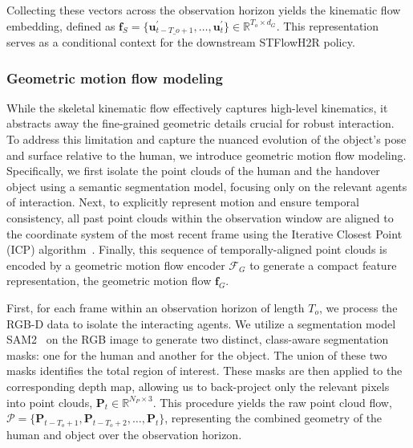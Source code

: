 \documentclass[final,5p,times,twocolumn]{elsarticle}
\begin{document}
Collecting these vectors across the observation horizon yields the kinematic flow embedding, defined as $\bm{f}_S = \{ \mathbf{u}_{t-T\_o + 1}^\prime, \dots, \mathbf{u}_{t}^\prime \} \in \mathbb{R}^{T_o \times d_G}$. This representation serves as a conditional context for the downstream STFlowH2R policy.



\subsubsection{Geometric motion flow modeling}  \label{sec:3.3.2}
While the skeletal kinematic flow effectively captures high-level kinematics, it abstracts away the fine-grained geometric details crucial for robust interaction. To address this limitation and capture the nuanced evolution of the object's pose and surface relative to the human, we introduce geometric motion flow modeling. Specifically, we first isolate the point clouds of the human and the handover object using a semantic segmentation model, focusing only on the relevant agents of interaction. Next, to explicitly represent motion and ensure temporal consistency, all past point clouds within the observation window are aligned to the coordinate system of the most recent frame using the Iterative Closest Point (ICP) algorithm~\cite{4767965}. Finally, this sequence of temporally-aligned point clouds is encoded by a geometric motion flow encoder $\mathcal{F}_G$ to generate a compact feature representation, the geometric motion flow $\bm{f}_G$.

First, for each frame within an observation horizon of length $T_o$, we process the RGB-D data to isolate the interacting agents. We utilize a segmentation model SAM2~\cite{ravi2024sam2} on the RGB image to generate two distinct, class-aware segmentation masks: one for the human and another for the object. The union of these two masks identifies the total region of interest. These masks are then applied to the corresponding depth map, allowing us to back-project only the relevant pixels into point clouds, $\mathbf{P}_t \in \mathbb{R}^{N_P \times 3}$. This procedure yields the raw point cloud flow, $ \mathcal{P} =  \{ \mathbf{P}_{t - T_o +1}, \mathbf{P}_{t - T_o +2}, \dots, \mathbf{P}_t \}$, representing the combined geometry of the human and object over the observation horizon.
\end{document}
